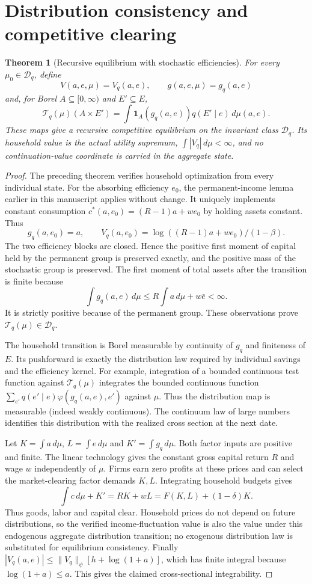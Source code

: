 \documentclass[11pt]{article}
\newtheorem{theorem}{Theorem}
\theoremstyle{definition}
\begin{document}
\section*{Distribution consistency and competitive clearing}
\begin{theorem}[Recursive equilibrium with stochastic efficiencies]
For every $\mu_0\in\mathcal D_q$, define
\[
 V(a,e,\mu)=V_q(a,e),\qquad g(a,e,\mu)=g_q(a,e)
\]
and, for Borel $A\subseteq[0,\infty)$ and $E'\subseteq E$,
\[
 \mathcal T_q(\mu)(A\times E')=
 \int \mathbf1_A(g_q(a,e))q(E'\mid e)\,d\mu(a,e).
\]
These maps give a recursive competitive equilibrium on the invariant
class $\mathcal D_q$. Its household value is the actual utility
supremum, $\int |V_q|\,d\mu<\infty$, and no continuation-value
coordinate is carried in the aggregate state.
\end{theorem}
\begin{proof}
The preceding theorem verifies household optimization from every
individual state. For the absorbing efficiency $e_0$, the permanent-income
lemma earlier in this manuscript applies without change. It uniquely
implements constant consumption $c^*(a,e_0)=(R-1)a+we_0$ by holding
assets constant. Thus
\[
 g_q(a,e_0)=a,\qquad
 V_q(a,e_0)=\log((R-1)a+we_0)/(1-\beta).
\]
The two efficiency blocks are closed. Hence the positive first moment
of capital held by the permanent group is preserved exactly, and the
positive mass of the stochastic group is preserved. The first moment
of total assets after the transition is finite because
\[
 \int g_q(a,e)\,d\mu\leq R\int a\,d\mu+w\bar e<\infty.
\]
It is strictly positive because of the permanent group. These observations
prove $\mathcal T_q(\mu)\in\mathcal D_q$.

The household transition is Borel measurable by continuity of $g_q$ and
finiteness of $E$. Its pushforward is exactly the distribution law
required by individual savings and the efficiency kernel. For example,
integration of a bounded continuous test function against
$\mathcal T_q(\mu)$ integrates the bounded continuous function
$\sum_{e'}q(e'\mid e)\varphi(g_q(a,e),e')$ against $\mu$.
Thus the distribution map is measurable (indeed weakly continuous).
The continuum law of large numbers identifies this distribution with the
realized cross section at the next date.

Let $K=\int a\,d\mu$, $L=\int e\,d\mu$ and
$K'=\int g_q\,d\mu$. Both factor inputs are positive and finite.
The linear technology gives the constant gross capital return $R$ and
wage $w$ independently of $\mu$. Firms earn zero profits at these
prices and can select the market-clearing factor demands $K,L$.
Integrating household budgets gives
\[
 \int c\,d\mu+K'=RK+wL
                   =F(K,L)+(1-\delta)K.
\]
Thus goods, labor and capital clear. Household prices do not depend on
future distributions, so the verified income-fluctuation value is also
the value under this endogenous aggregate distribution transition;
no exogenous distribution law is substituted for equilibrium consistency.
Finally $|V_q(a,e)|\leq\|V_q\|_\psi[h+\log(1+a)]$, which has
finite integral because $\log(1+a)\leq a$. This gives the claimed
cross-sectional integrability.
\end{proof}
\end{document}
